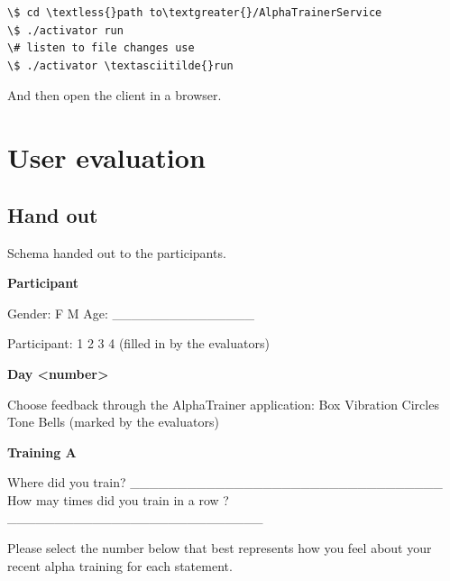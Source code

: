 \documentclass[a4paper,10pt,english,lof,lot,twoside]{puthesis}
\begin{document}
\begin{Verbatim}[commandchars=\\\{\}]
\$ cd \textless{}path to\textgreater{}/AlphaTrainerService
\$ ./activator run
\# listen to file changes use
\$ ./activator \textasciitilde{}run
\end{Verbatim}

And then open the client in a browser.
\label{appendix_evaluation::doc}

\chapter{User evaluation}
\label{appendix_evaluation:appendix-final-evaluation}\label{appendix_evaluation:user-evaluation}

\section{Hand out}
\label{appendix_evaluation:hand-out}\label{appendix_evaluation:appendix-final-evaluation-hand-out}
Schema handed out to the participants.

\textbf{Participant}

Gender: F \textbar{} M
Age: \_\_\_\_\_\_\_\_\_\_\_\_\_\_\_

Participant: 1 \textbar{} 2 \textbar{} 3 \textbar{} 4
(filled in by the evaluators)

\textbf{Day \textless{}number\textgreater{}}

Choose feedback through the AlphaTrainer application:  Box \textbar{} Vibration \textbar{} Circles \textbar{} Tone \textbar{} Bells (marked by the evaluators)

\textbf{Training A}

Where did you train? \_\_\_\_\_\_\_\_\_\_\_\_\_\_\_\_\_\_\_\_\_\_\_\_\_\_\_\_\_\_\_\_\_
How may times did you train in a row ? \_\_\_\_\_\_\_\_\_\_\_\_\_\_\_\_\_\_\_\_\_\_\_\_\_\_\_

Please select the number below that best represents how you
feel about your recent alpha training for each statement.

{\hfill}
\end{document}
